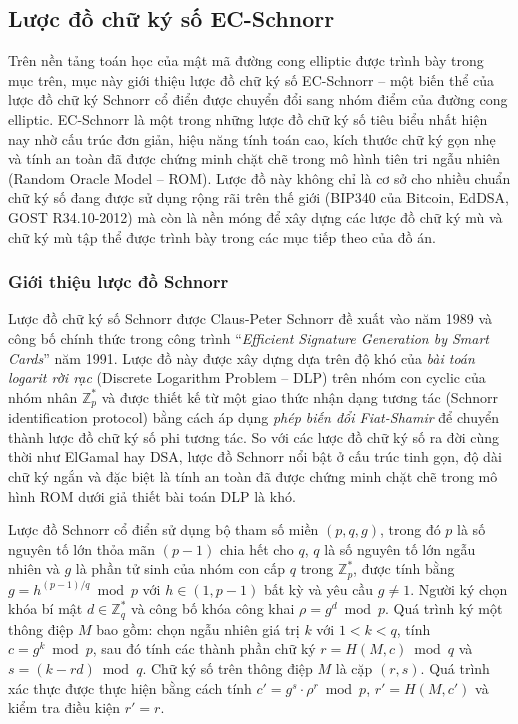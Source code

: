 \subsection{Lược đồ chữ ký số EC-Schnorr}

Trên nền tảng toán học của mật mã đường cong elliptic được trình bày trong mục trên, mục này giới thiệu lược đồ chữ ký số EC-Schnorr -- một biến thể của lược đồ chữ ký Schnorr cổ điển được chuyển đổi sang nhóm điểm của đường cong elliptic. EC-Schnorr là một trong những lược đồ chữ ký số tiêu biểu nhất hiện nay nhờ cấu trúc đơn giản, hiệu năng tính toán cao, kích thước chữ ký gọn nhẹ và tính an toàn đã được chứng minh chặt chẽ trong mô hình tiên tri ngẫu nhiên (Random Oracle Model -- ROM). Lược đồ này không chỉ là cơ sở cho nhiều chuẩn chữ ký số đang được sử dụng rộng rãi trên thế giới (BIP340 của Bitcoin, EdDSA, GOST R34.10-2012) mà còn là nền móng để xây dựng các lược đồ chữ ký mù và chữ ký mù tập thể được trình bày trong các mục tiếp theo của đồ án.

\subsubsection{Giới thiệu lược đồ Schnorr}

Lược đồ chữ ký số Schnorr được Claus-Peter Schnorr đề xuất vào năm 1989 và công bố chính thức trong công trình ``\textit{Efficient Signature Generation by Smart Cards}'' năm 1991. Lược đồ này được xây dựng dựa trên độ khó của \textit{bài toán logarit rời rạc} (Discrete Logarithm Problem -- DLP) trên nhóm con cyclic của nhóm nhân $\mathbb{Z}_p^*$ và được thiết kế từ một giao thức nhận dạng tương tác (Schnorr identification protocol) bằng cách áp dụng \textit{phép biến đổi Fiat-Shamir} để chuyển thành lược đồ chữ ký số phi tương tác. So với các lược đồ chữ ký số ra đời cùng thời như ElGamal hay DSA, lược đồ Schnorr nổi bật ở cấu trúc tinh gọn, độ dài chữ ký ngắn và đặc biệt là tính an toàn đã được chứng minh chặt chẽ trong mô hình ROM dưới giả thiết bài toán DLP là khó.

Lược đồ Schnorr cổ điển sử dụng bộ tham số miền $(p, q, g)$, trong đó $p$ là số nguyên tố lớn thỏa mãn $(p-1)$ chia hết cho $q$, $q$ là số nguyên tố lớn ngẫu nhiên và $g$ là phần tử sinh của nhóm con cấp $q$ trong $\mathbb{Z}_p^*$, được tính bằng $g = h^{(p-1)/q} \bmod p$ với $h \in (1, p-1)$ bất kỳ và yêu cầu $g \neq 1$. Người ký chọn khóa bí mật $d \in \mathbb{Z}_q^*$ và công bố khóa công khai $\rho = g^d \bmod p$. Quá trình ký một thông điệp $M$ bao gồm: chọn ngẫu nhiên giá trị $k$ với $1 < k < q$, tính $c = g^k \bmod p$, sau đó tính các thành phần chữ ký $r = H(M, c) \bmod q$ và $s = (k - r d) \bmod q$. Chữ ký số trên thông điệp $M$ là cặp $(r, s)$. Quá trình xác thực được thực hiện bằng cách tính $c' = g^s \cdot \rho^r \bmod p$, $r' = H(M, c')$ và kiểm tra điều kiện $r' = r$.

